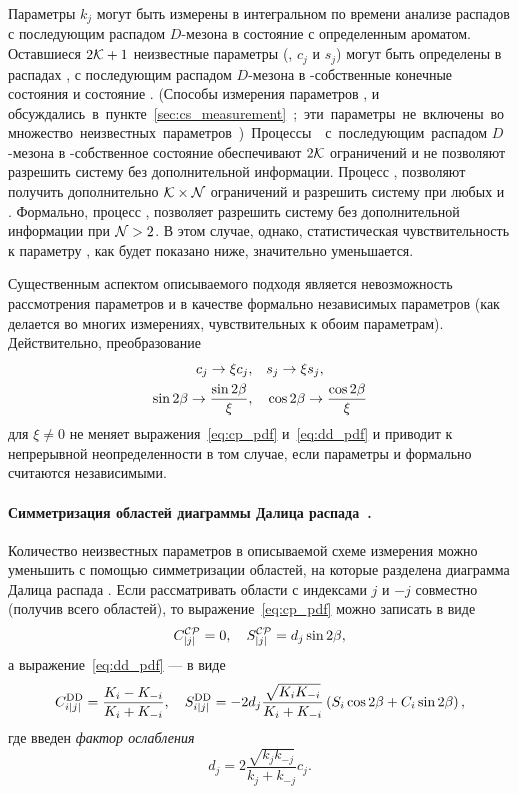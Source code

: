 Параметры $k_j$ могут быть измерены в интегральном по времени анализе распадов \bdbpp с последующим распадом $D$-мезона в состояние с определенным ароматом.  Оставшиеся $2\mathcal{K}+1$ неизвестные параметры (\pphi, $c_j$ и $s_j$) могут быть определены в распадах \bdbpp, с последующим распадом $D$-мезона в \cpconj-собственные конечные состояния и состояние \kspp. (Способы измерения параметров \ki, \ci и \si обсуждались в пункте~\ref{sec:cs_measurement}; эти параметры не включены во множество неизвестных параметров.)  

Процессы \bdbpp с последующим распадом $D$-мезона в \cpconj-собственное состояние обеспечивают $2\mathcal{K}$ ограничений и не позволяют разрешить систему без дополнительной информации.  Процесс \bdbpp, \dbkpp позволяют получить дополнительно $\mathcal{K}\times\mathcal{N}$ ограничений и разрешить систему при любых \mck и \mcn.  Формально, процесс \bdbpp, \dbkpp позволяет разрешить систему без дополнительной информации при $\mathcal{N}>2$.  В этом случае, однако, статистическая чувствительность к параметру \pphi, как будет показано ниже, значительно уменьшается.

Существенным аспектом описываемого подходя является невозможность рассмотрения параметров \sindbeta и \cosdbeta в качестве формально независимых параметров (как делается во многих измерениях, чувствительных к обоим параметрам).  Действительно, преобразование
\begin{equation}\label{eq:ambiguity}
\begin{split}
 c_j\to \xi c_j,&\quad s_j\to \xi s_j,\\
 \sin{2\ensuremath{\beta}}\to\frac{\sin{2\ensuremath{\beta}}}{\xi},&\quad\cos{2\ensuremath{\beta}}\to\frac{\cos{2\ensuremath{\beta}}}{\xi}
\end{split}
\end{equation}
для $\xi\neq 0$ не меняет выражения~\eqref{eq:cp_pdf} и~\eqref{eq:dd_pdf} и приводит к непрерывной неопределенности в том случае, если параметры \sindbeta и \cosdbeta формально считаются независимыми.

\paragraph{\boldmath Симметризация областей диаграммы Далица распада~\bdbpp. } Количество неизвестных параметров в описываемой схеме измерения можно уменьшить с помощью симметризации областей, на которые разделена диаграмма Далица распада \bdbpp.  Если рассматривать области с индексами $j$ и $-j$ совместно (получив всего \mck областей), то выражение~\eqref{eq:cp_pdf} можно записать в виде
\begin{equation}\label{eq:cp_dil_pdf}
 C^{\mathcal{CP}}_{|j|} = 0,\quad
 S^{\mathcal{CP}}_{|j|} = d_j\sin{2\ensuremath{\beta}},
\end{equation}
а выражение~\eqref{eq:dd_pdf} --- в виде
\begin{equation}\label{eq:dd_dil_pdf}
 C^{\mathrm{DD}}_{i|j|} = \frac{K_i-K_{-i}}{K_i+K_{-i}},\quad
 S^{\mathrm{DD}}_{i|j|} =-2d_j\frac{\sqrt{K_iK_{-i}}}{K_i+K_{-i}}\left(S_i\cos{2\ensuremath{\beta}}+C_i\sin{2\ensuremath{\beta}}\right),
\end{equation}
где введен \emph{фактор ослабления}
\begin{equation}\label{eq:dil_factor}
 d_{j} = 2\frac{\sqrt{k_jk_{-j}}}{k_j+k_{-j}}c_j.
\end{equation}


